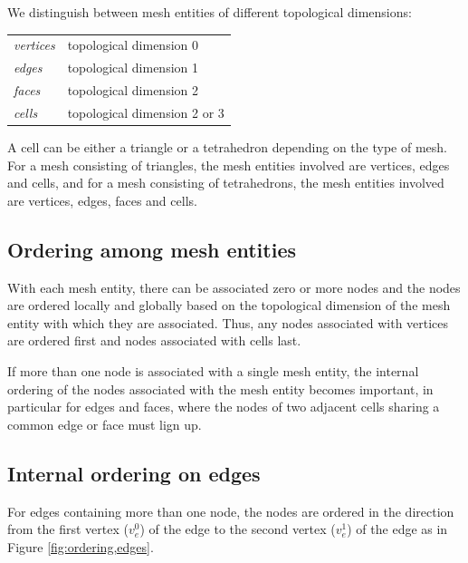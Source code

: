 We distinguish between mesh entities of different topological
dimensions:

\begin{center}
  \begin{tabular}{l|l}
    \emph{vertices} & topological dimension 0 \\
    \emph{edges}    & topological dimension 1 \\
    \emph{faces}    & topological dimension 2 \\
    \emph{cells}    & topological dimension 2 or 3
  \end{tabular}
\end{center}

A cell can be either a triangle or a tetrahedron depending on
the type of mesh. For a mesh consisting of triangles, the mesh
entities involved are vertices, edges and cells, and for a mesh
consisting of tetrahedrons, the mesh entities involved are vertices,
edges, faces and cells.

\subsection{Ordering among mesh entities}

With each mesh entity, there can be associated zero or more nodes and
the nodes are ordered locally and globally based on the topological
dimension of the mesh entity with which they are associated. Thus,
any nodes associated with vertices are ordered first and nodes
associated with cells last.

If more than one node is associated with a single mesh entity, the
internal ordering of the nodes associated with the mesh entity becomes
important, in particular for edges and faces, where the nodes of two
adjacent cells sharing a common edge or face must lign up.

\subsection{Internal ordering on edges}

For edges containing more than one node, the nodes are ordered in the
direction from the first vertex ($v_e^0$) of the edge to the second
vertex ($v_e^1$) of the edge as in Figure \ref{fig:ordering,edges}.


